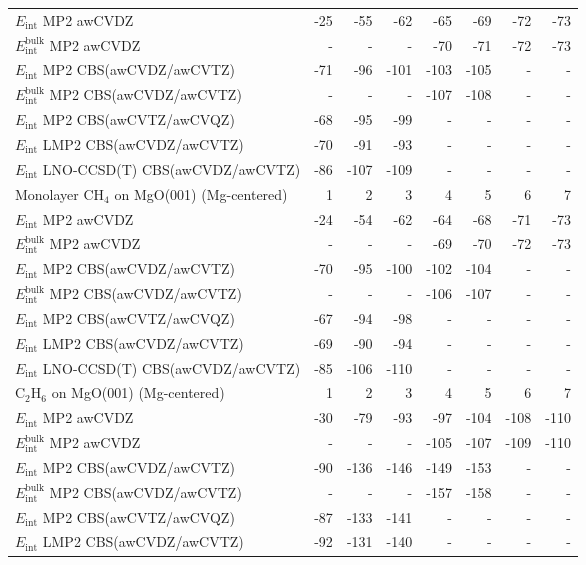 \begin{longtable}{lrrrrrrr}
$E_\text{int}$ MP2 awCVDZ & -25 & -55 & -62 & -65 & -69 & -72 & -73 \\
$E_\text{int}^\text{bulk}$ MP2 awCVDZ & - & - & - & -70 & -71 & -72 & -73 \\
$E_\text{int}$ MP2 CBS(awCVDZ/awCVTZ) & -71 & -96 & -101 & -103 & -105 & - & - \\
$E_\text{int}^\text{bulk}$ MP2 CBS(awCVDZ/awCVTZ) & - & - & - & -107 & -108 & - & - \\
$E_\text{int}$ MP2 CBS(awCVTZ/awCVQZ) & -68 & -95 & -99 & - & - & - & - \\
$E_\text{int}$ LMP2 CBS(awCVDZ/awCVTZ) & -70 & -91 & -93 & - & - & - & - \\
$E_\text{int}$ LNO-CCSD(T) CBS(awCVDZ/awCVTZ) & -86 & -107 & -109 & - & - & - & - \\
\toprule
Monolayer CH$_4$ on MgO(001) (Mg-centered) & 1 & 2 & 3 & 4 & 5 & 6 & 7 \\ 
\midrule
$E_\text{int}$ MP2 awCVDZ & -24 & -54 & -62 & -64 & -68 & -71 & -73 \\
$E_\text{int}^\text{bulk}$ MP2 awCVDZ & - & - & - & -69 & -70 & -72 & -73 \\
$E_\text{int}$ MP2 CBS(awCVDZ/awCVTZ) & -70 & -95 & -100 & -102 & -104 & - & - \\
$E_\text{int}^\text{bulk}$ MP2 CBS(awCVDZ/awCVTZ) & - & - & - & -106 & -107 & - & - \\
$E_\text{int}$ MP2 CBS(awCVTZ/awCVQZ) & -67 & -94 & -98 & - & - & - & - \\
$E_\text{int}$ LMP2 CBS(awCVDZ/awCVTZ) & -69 & -90 & -94 & - & - & - & - \\
$E_\text{int}$ LNO-CCSD(T) CBS(awCVDZ/awCVTZ) & -85 & -106 & -110 & - & - & - & - \\
\toprule
C$_2$H$_6$ on MgO(001) (Mg-centered) & 1 & 2 & 3 & 4 & 5 & 6 & 7 \\ 
\midrule
$E_\text{int}$ MP2 awCVDZ & -30 & -79 & -93 & -97 & -104 & -108 & -110 \\
$E_\text{int}^\text{bulk}$ MP2 awCVDZ & - & - & - & -105 & -107 & -109 & -110 \\
$E_\text{int}$ MP2 CBS(awCVDZ/awCVTZ) & -90 & -136 & -146 & -149 & -153 & - & - \\
$E_\text{int}^\text{bulk}$ MP2 CBS(awCVDZ/awCVTZ) & - & - & - & -157 & -158 & - & - \\
$E_\text{int}$ MP2 CBS(awCVTZ/awCVQZ) & -87 & -133 & -141 & - & - & - & - \\
$E_\text{int}$ LMP2 CBS(awCVDZ/awCVTZ) & -92 & -131 & -140 & - & - & - & - \\

\end{longtable}
